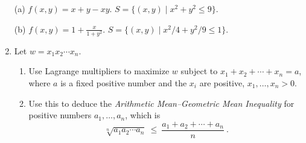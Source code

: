 \documentclass[12pt]{article}
\begin{document}
\begin{enumerate}
  (a) $f(x,y)=x+y-xy$.
  \qquad  $S=\{(x,y)\mid x^2+y^2\leq 9\}$.


  (b) $f(x,y)=1+\frac{x}{1+y^2}$.
      \qquad $S=\{ (x,y) \mid x^2/4 + y^2/9 \leq 1\}$.
\vspace{-2pt}


\item  Let $w=x_1x_2\dotsb x_n$.
  \begin{enumerate}
  \item Use Lagrange multipliers to maximize $w$ subject to $x_1+x_2+\dotsb+x_n=a$, where $a$ is a fixed positive number and the $x_i$ are
    positive, $x_1,\dotsc,x_n>0$.

  \item Use this to deduce the {\sl\color{Blue}Arithmetic Mean--Geometric Mean Inequality} for positive numbers $a_1,\dotsc,a_n$, which is
    \[
    \sqrt[n]{a_1 a_2 \dotsb a_n}\ \leq\ \frac{a_1+a_2+ \dotsb+a_n}{n}\ .
    \]
  \end{enumerate}
\vspace{-2pt}

\end{enumerate}
\end{document}
